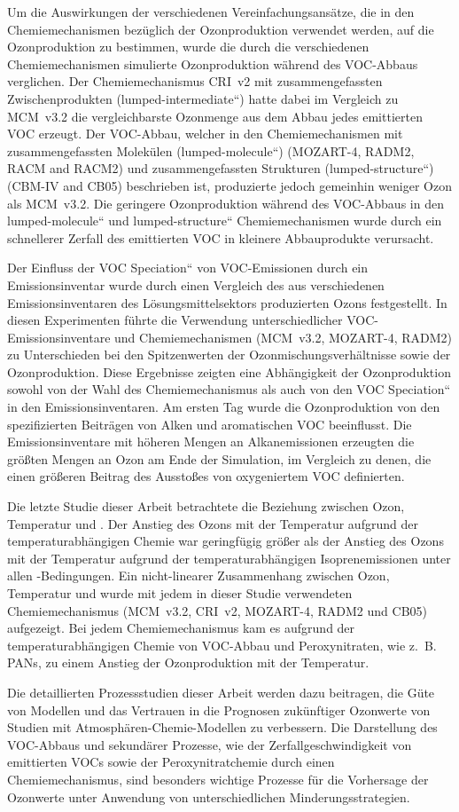Um die Auswirkungen der verschiedenen Vereinfachungsansätze, die in den Chemiemechanismen bezüglich der Ozonproduktion verwendet werden, auf die Ozonproduktion zu bestimmen, wurde die durch die verschiedenen Chemiemechanismen simulierte Ozonproduktion während des VOC-Abbaus verglichen.
Der Chemiemechanismus CRI~v2 mit zusammengefassten Zwischenprodukten (\quotedblbase lumped-intermediate``) hatte dabei im Vergleich zu  MCM~v3.2 die vergleichbarste Ozonmenge aus dem Abbau jedes emittierten VOC erzeugt. 
Der VOC-Abbau, welcher in den Chemiemechanismen mit zusammengefassten Molekülen (\quotedblbase lumped-molecule``) (MOZART-4, RADM2, RACM and RACM2) und zusammengefassten Strukturen (\quotedblbase lumped-structure``) (CBM-IV and CB05) beschrieben ist, produzierte jedoch gemeinhin weniger Ozon als MCM~v3.2. 
Die geringere Ozonproduktion während des VOC-Abbaus in den \quotedblbase lumped-molecule`` und \quotedblbase lumped-structure`` Chemiemechanismen wurde durch ein schnellerer Zerfall des emittierten VOC in kleinere Abbauprodukte verursacht.

Der Einfluss der \quotedblbase VOC Speciation`` von VOC-Emissionen durch ein Emissionsinventar wurde durch einen Vergleich des aus verschiedenen Emissionsinventaren des Lösungsmittelsektors produzierten Ozons festgestellt.
In diesen Experimenten führte die Verwendung unterschiedlicher VOC-Emissionsinventare und Chemiemechanismen (MCM~v3.2, MOZART-4, RADM2) zu Unterschieden bei den Spitzenwerten der Ozonmischungsverhältnisse sowie der Ozonproduktion.
Diese Ergebnisse zeigten eine Abhängigkeit der Ozonproduktion sowohl von der Wahl des Chemiemechanismus als auch von den \quotedblbase VOC Speciation`` in den Emissionsinventaren.
Am ersten Tag wurde die Ozonproduktion von den spezifizierten Beiträgen von Alken und aromatischen VOC beeinflusst.
Die Emissionsinventare mit höheren Mengen an Alkanemissionen erzeugten die größten Mengen an Ozon am Ende der Simulation, im Vergleich zu denen, die einen größeren Beitrag des Ausstoßes von oxygeniertem VOC definierten.

Die letzte Studie dieser Arbeit betrachtete die Beziehung zwischen Ozon, Temperatur und .
Der Anstieg des Ozons mit der Temperatur aufgrund der temperaturabhängigen Chemie war geringfügig größer als der Anstieg des Ozons mit der Temperatur aufgrund der temperaturabhängigen Isoprenemissionen unter allen -Bedingungen.
Ein nicht-linearer Zusammenhang zwischen Ozon, Temperatur und  wurde mit jedem in dieser Studie verwendeten Chemiemechanismus (MCM~v3.2, CRI~v2, MOZART-4, RADM2 und CB05) aufgezeigt.
Bei jedem Chemiemechanismus kam es aufgrund der temperaturabhängigen Chemie von VOC-Abbau und Peroxynitraten, wie z.~B. PANs, zu einem Anstieg der Ozonproduktion mit der Temperatur. 

Die detaillierten Prozessstudien dieser Arbeit werden dazu beitragen, die Güte von Modellen und das Vertrauen in die Prognosen zukünftiger Ozonwerte von Studien mit Atmosphären-Chemie-Modellen zu verbessern.
Die Darstellung des VOC-Abbaus und sekundärer Prozesse, wie der Zerfallgeschwindigkeit von emittierten VOCs sowie der Peroxynitratchemie durch einen Chemiemechanismus, sind besonders wichtige Prozesse für die Vorhersage der Ozonwerte unter Anwendung von unterschiedlichen Minderungsstrategien.
